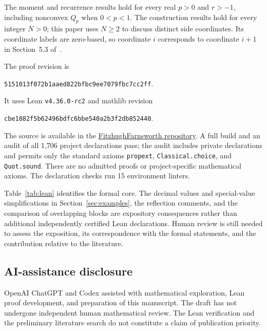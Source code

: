 \documentclass[11pt]{article}
\numberwithin{equation}{section}
\theoremstyle{remark}
\newcommand{\lean}[1]{{\footnotesize\nolinkurl{#1}}}
\newcommand{\proofrevision}{5151013f072b1aaed822bfbc9ee7079fbc7cc2ff}
\begin{document}
The moment and recurrence results hold for every real $p>0$ and
$r>-1$, including nonconvex $Q_p$ when $0<p<1$.
The construction results hold for every integer $N>0$; this paper
uses $N\geq2$ to discuss distinct side coordinates.
Its coordinate labels are zero-based, so coordinate $i$ corresponds
to coordinate $i+1$ in Section~5.3 of~\cite{FitzhughFarnsworth2013}.

The proof revision is
\begin{center}
\small\texttt{\proofrevision}.
\end{center}
It uses Lean \lean{v4.36.0-rc2} and mathlib revision
\begin{center}
\small\texttt{cbe1882f5b62496bdfc6bbe540a2b3f2db852440}.
\end{center}
The source is available in the
\href{https://github.com/speadskater/FitzhughFarnsworth}{FitzhughFarnsworth repository}.
A full build and an audit of all 1,706 project declarations pass;
the audit includes private declarations and permits only the standard
axioms \lean{propext}, \lean{Classical.choice}, and \lean{Quot.sound}.
There are no admitted proofs or project-specific mathematical axioms.
The declaration checks run 15 environment linters.

Table~\ref{tab:lean} identifies the formal core. The decimal values
and special-value simplifications in Section~\ref{sec:examples},
the reflection comments, and the comparison of overlapping blocks
are expository consequences rather than additional independently
certified Lean declarations. Human review is still needed to assess
the exposition, its correspondence with the formal statements, and
the contribution relative to the literature.

\begin{samepage}
\subsection*{AI-assistance disclosure}

OpenAI ChatGPT and Codex assisted with mathematical exploration,
Lean proof development, and preparation of this manuscript.
The draft has not undergone independent human mathematical review.
The Lean verification and the preliminary literature search do not
constitute a claim of publication priority.

\end{samepage}

\begingroup
\raggedright


\endgroup
\end{document}
